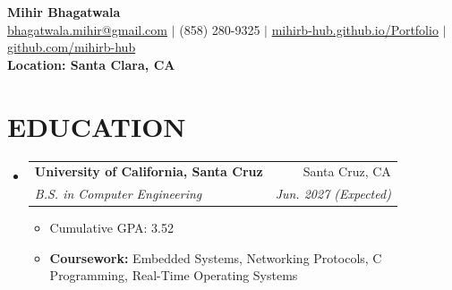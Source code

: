 \documentclass[letterpaper,11pt]{article}
\makeatletter
\newcommand{\resumeItem}[1]{
  \item\small{
    {#1 \vspace{-2pt}}
  }
}
\newcommand{\resumeSubheading}[4]{
  \vspace{-2pt}\item
    \begin{tabular*}{0.97\textwidth}[t]{l@{\extracolsep{\fill}}r}
      \textbf{#1} & #2 \\
      \textit{\small#3} & \textit{\small #4} \\
    \end{tabular*}\vspace{-7pt}
}
\newcommand{\resumeSubHeadingListStart}{\begin{itemize}[leftmargin=0.15in, label={}]}
\newcommand{\resumeSubHeadingListEnd}{\end{itemize}}
\newcommand{\resumeItemListStart}{\begin{itemize}}
\newcommand{\resumeItemListEnd}{\end{itemize}\vspace{-5pt}}
\makeatother
\begin{document}

\begin{center}
    \textbf{\Huge Mihir Bhagatwala} \\ \vspace{5pt}
    \small \href{mailto:bhagatwala.mihir@gmail.com}{bhagatwala.mihir@gmail.com} $|$ (858) 280-9325 $|$ \href{https://mihirb-hub.github.io/Portfolio/}{mihirb-hub.github.io/Portfolio} $|$ \href{https://github.com/mihirb-hub}{github.com/mihirb-hub} \\ \vspace{2pt}
    \textbf{Location: Santa Clara, CA}
\end{center}


\section{EDUCATION}
  \resumeSubHeadingListStart
    \resumeSubheading
      {University of California, Santa Cruz}{Santa Cruz, CA}
      {B.S. in Computer Engineering}{Jun. 2027 (Expected)}
      \resumeItemListStart
        \resumeItem{Cumulative GPA: 3.52}
        \resumeItem{\textbf{Coursework:} Embedded Systems, Networking Protocols, C Programming, Real-Time Operating Systems}
      \resumeItemListEnd
  \resumeSubHeadingListEnd


\end{document}
